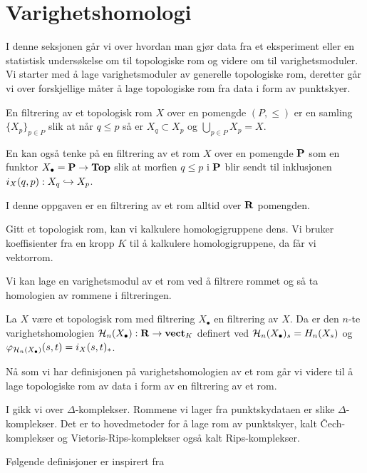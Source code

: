 \section{Varighetshomologi}\label{sek:VarHom}
I denne seksjonen går vi over hvordan man gjør data fra et
eksperiment eller en statistisk undersøkelse om til topologiske
rom og videre om til varighetsmoduler. Vi starter med å lage
varighetsmoduler av generelle topologiske rom, deretter går vi
over forskjellige måter å lage topologiske rom fra data i form av
punktskyer.

\begin{definisjon}\label{def:FiltTop}
En filtrering av et topologisk rom $X$ over en pomengde $(P,\leq)$
er en samling $\{X_p\}_{p\in P}$ slik at når $q\leq p$ så er
  $X_q\subset X_p$ og $\bigcup_{p\in P} X_p = X$.
\end{definisjon}

En kan også tenke på en filtrering av et rom $X$ over en pomengde
$\textnormal{\textbf{{P}}}$ som en funktor $X_\bullet = \textnormal{\textbf{{P}}}\to\textnormal{\textbf{Top}}$ slik at morfien
$q\leq p$ i $\textnormal{\textbf{{P}}}$ blir sendt til inklusjonen $i_X(q,p):
X_q\hookrightarrow X_p$.

I denne oppgaven er en filtrering av et rom alltid over $\textnormal{\textbf{{R}}}$
pomengden.

Gitt et topologisk rom, kan vi kalkulere homologigruppene dens.
Vi bruker koeffisienter fra en kropp $K$ til å kalkulere
homologigruppene, da får vi vektorrom.

Vi kan lage en varighetsmodul av et rom ved å filtrere rommet og
så ta homologien av rommene i filtreringen.

\begin{definisjon}\label{def:VarHom}
  La $X$ være et topologisk rom med filtrering $X_\bullet$ en
  filtrering av $X$. Da er den $n$-te varighetshomologien
  $\mathcal{H}_n(X_\bullet):
  \textnormal{\textbf{{R}}}\to\textnormal{\textbf{vect}}_K$ definert ved $\mathcal{H}_n(X_\bullet)_s = H_n(X_s)$ og
  $\varphi_{\mathcal{H}_n(X_\bullet)}(s,t) = i_X(s,t)_\ast$.
\end{definisjon}

Nå som vi har definisjonen på varighetshomologien av et rom går vi
videre til å lage topologiske rom av data i form av en filtrering
av et rom.

I  gikk vi over
$\Delta$-komplekser. Rommene vi lager fra punktskydataen er slike
$\Delta$-komplekser. Det er to hovedmetoder for å lage rom av
punktskyer, kalt Čech-komplekser og Vietoris-Rips-komplekser også
kalt Rips-komplekser.

Følgende definisjoner er inspirert fra \cite{Schenck2022}

